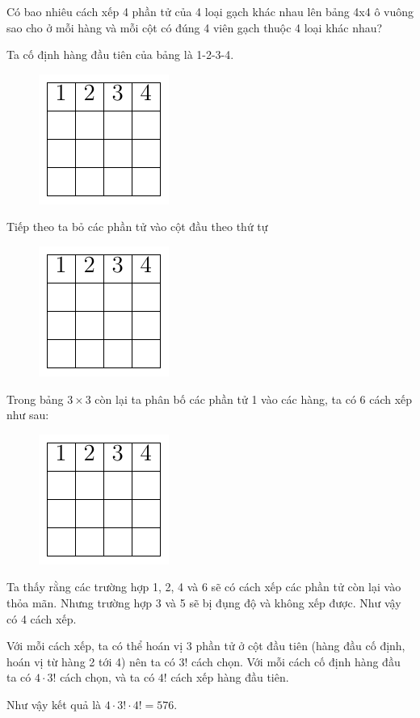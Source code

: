 \begin{problem}[Bài 4]
    Có bao nhiêu cách xếp 4 phần tử của 4 loại gạch khác nhau lên bảng 4x4 ô vuông sao cho ở mỗi hàng và mỗi cột có đúng 4 viên gạch thuộc 4 loại khác nhau?
\end{problem}

\begin{solution}
    Ta cố định hàng đầu tiên của bảng là 1-2-3-4.
    \begin{figure}[htb]
        \centering
        \includegraphics[page=1]{contests/internet_olympiad_figures.pdf}
    \end{figure}

    Tiếp theo ta bỏ các phần tử vào cột đầu theo thứ tự
    \begin{figure}[htb]
        \centering
        \includegraphics[page=2]{contests/internet_olympiad_figures.pdf}
    \end{figure}

    Trong bảng $3 \times 3$ còn lại ta phân bố các phần tử 1 vào các hàng, ta có 6 cách xếp như sau:
    \begin{figure}
        \centering
        \includegraphics[page=3]{contests/internet_olympiad_figures.pdf}
    \end{figure}

    Ta thấy rằng các trường hợp 1, 2, 4 và 6 sẽ có cách xếp các phần tử còn lại vào thỏa mãn. Nhưng trường hợp 3 và 5 sẽ bị đụng độ và không xếp được. Như vậy có 4 cách xếp.

    Với mỗi cách xếp, ta có thể hoán vị 3 phần tử ở cột đầu tiên (hàng đầu cố định, hoán vị từ hàng 2 tới 4) nên ta có $3!$ cách chọn. Với mỗi cách cố định hàng đầu ta có $4 \cdot 3!$ cách chọn, và ta có $4!$ cách xếp hàng đầu tiên.

    Như vậy kết quả là $4 \cdot 3! \cdot 4! = 576$.
\end{solution}

